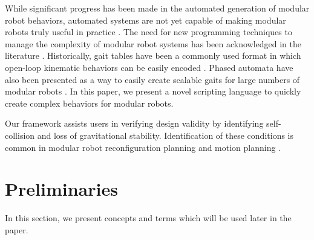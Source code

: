 \documentclass[conference]{IEEEtran}
\theoremstyle{definition}
\begin{document}
While significant progress has been made in the automated generation of modular robot behaviors,
automated systems are not yet capable of making modular robots truly useful in practice
\cite{yim2007modular}.  The need for new programming techniques to manage the complexity
of modular robot systems has been acknowledged in the literature \cite{yim2000modular}.
Historically, gait tables have been a commonly used format in which open-loop kinematic
behaviors can be easily encoded \cite{yim1994locomotion}. Phased automata have also
been presented as a way to easily create scalable gaits for large numbers of modular
robots \cite{zhang2003phase}. In this paper, we present a novel scripting language
to quickly create complex behaviors for modular robots.

Our framework assists users in verifying design validity by identifying self-collision
and loss of gravitational stability. Identification of these conditions is common
in modular robot reconfiguration planning \cite{casal2001reconfiguration} and motion
planning \cite{yoshida2002self}.

\section{Preliminaries}
\label{sec:preliminaries}
In this section, we present concepts and terms which will be used later in the paper.
\end{document}

